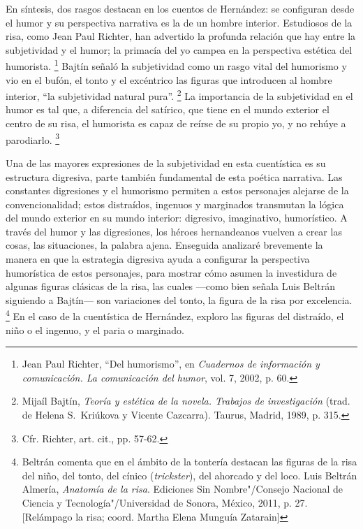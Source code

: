 \documentclass[14pt,twoside,final]{extbook} %
\let\oldfootnote\footnote
\renewcommand\footnote[1]{%
\oldfootnote{\hspace{1mm}#1}}
\begin{document}
En síntesis, dos rasgos destacan en los cuentos de Hernández: se configuran desde el humor y su perspectiva narrativa es la de un hombre interior. Estudiosos de la risa, como Jean Paul Richter, han advertido la profunda relación que hay entre la subjetividad y el humor; la primacía del yo campea en la perspectiva estética del humorista.\footnote{Jean Paul Richter, ``Del humorismo'', en \emph{Cuadernos de información y comunicación. La comunicación del humor}, vol. 7, 2002, p. 60.} Bajtín señaló la subjetividad como un rasgo vital del humorismo y vio en el bufón, el tonto y el excéntrico las figuras que introducen al hombre interior, ``la subjetividad natural pura''.\footnote{Mijaíl Bajtín, \emph{Teoría y estética de la novela. Trabajos de investigación} (trad. de Helena S.~Kriúkova y Vicente Cazcarra). Taurus, Madrid, 1989, p. 315.} La importancia de la subjetividad en el humor es tal que, a diferencia del satírico, que tiene en el mundo exterior el centro de su risa, el humorista es capaz de reírse de su propio yo, y no rehúye a parodiarlo.\footnote{Cfr. Richter, art. cit., pp. 57-62.}

Una de las mayores expresiones de la subjetividad en esta cuentística es su estructura digresiva, parte también fundamental de esta poética narrativa. Las constantes digresiones y el humorismo permiten a estos personajes alejarse de la convencionalidad; estos distraídos, ingenuos y marginados transmutan la lógica del mundo exterior en su mundo interior: digresivo, imaginativo, humorístico. A través del humor y las digresiones, los héroes hernandeanos vuelven a crear las cosas, las situaciones, la palabra ajena. Enseguida analizaré brevemente la manera en que la estrategia digresiva ayuda a configurar la perspectiva humorística de estos personajes, para mostrar cómo asumen la investidura de algunas figuras clásicas de la risa, las cuales ---como bien señala Luis Beltrán siguiendo a Bajtín--- son variaciones del tonto, la figura de la risa por excelencia.\footnote{Beltrán comenta que en el ámbito de la tontería destacan las figuras de la risa del niño, del tonto, del cínico (\emph{trickster}), del ahorcado y del loco. Luis Beltrán Almería, \emph{Anatomía de la risa}. Ediciones Sin Nombre"/Consejo Nacional de Ciencia y Tecnología"/Universidad de Sonora, México, 2011, p. 27. [Relámpago la risa; coord. Martha Elena Munguía Zatarain]} En el caso de la cuentística de Hernández, exploro las figuras del distraído, el niño o el ingenuo, y el paria o marginado.
\end{document}
